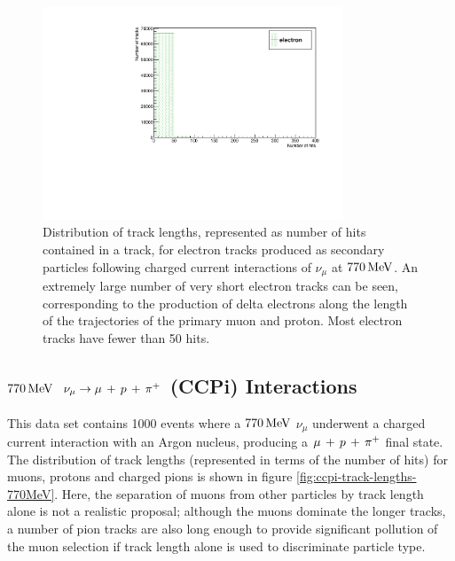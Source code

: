\begin{figure}
\centering
\includegraphics[angle=-90,width=0.8\textwidth]{chapters/particleid_images/electron-lengths-ccqe-770}
\caption[Track length distribution for $e^{-}$ from $770\MeV$ neutrinos (CCQE)]{\label{fig:ccqe-electron-lengths-770MeV}Distribution of track lengths, represented as number of hits contained in a track, for electron tracks produced as secondary particles following charged current interactions of $\nu_\mu$ at $770\MeV$. An extremely large number of very short electron tracks can be seen, corresponding to the production of delta electrons along the length of the trajectories of the primary muon and proton. Most electron tracks have fewer than 50 hits.}
\end{figure}


\clearpage
\subsection{$770\MeV$ $\nu_\mu \rightarrow \mu\,+\,p\,+\,\pi^{+}$ (\acs{CCPi}) Interactions}
This data set contains 1000 events where a $770\MeV$ $\nu_\mu$ underwent a charged current interaction with an Argon nucleus, producing a $\mu\,+\,p\,+\,\pi^{+}$ final state. The distribution of track lengths (represented in terms of the number of hits) for muons, protons and charged pions is shown in figure \ref{fig:ccpi-track-lengths-770MeV}. Here, the separation of muons from other particles by track length alone is not a realistic proposal; although the muons dominate the longer tracks, a number of pion tracks are also long enough to provide significant pollution of the muon selection if track length alone is used to discriminate particle type.

